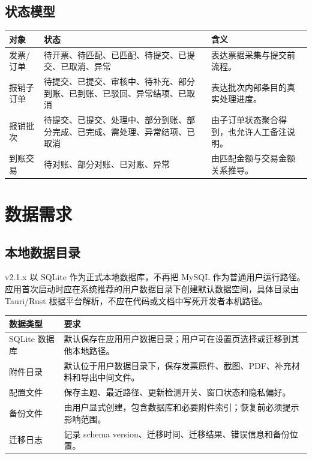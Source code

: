 \documentclass[UTF8,zihao=-4]{ctexart}
\begin{document}
\subsection{状态模型}

\begin{longtable}{p{3.2cm}p{4.4cm}p{6.8cm}}
\toprule
对象 & 状态 & 含义 \\
\midrule
发票/订单 & 待开票、待匹配、已匹配、待提交、已提交、已取消、异常 & 表达票据采集与提交前流程。 \\
报销子订单 & 待提交、已提交、审核中、待补充、部分到账、已到账、已驳回、异常结项、已取消 & 表达批次内部条目的真实处理进度。 \\
报销批次 & 待提交、已提交、处理中、部分到账、部分完成、已完成、需处理、异常结项、已取消 & 由子订单状态聚合得到，也允许人工备注说明。 \\
到账交易 & 待对账、部分对账、已对账、异常 & 由匹配金额与交易金额关系推导。 \\
\bottomrule
\end{longtable}

\section{数据需求}

\subsection{本地数据目录}

v2.1.x 以 SQLite 作为正式本地数据库，不再把 MySQL 作为普通用户运行路径。应用首次启动时应在系统推荐的用户数据目录下创建默认数据空间，具体目录由 Tauri/Rust 根据平台解析，不应在代码或文档中写死开发者本机路径。

\begin{longtable}{p{4.0cm}p{10.4cm}}
\toprule
数据类型 & 要求 \\
\midrule
SQLite 数据库 & 默认保存在应用用户数据目录；用户可在设置页选择或迁移到其他本地路径。 \\
附件目录 & 默认位于用户数据目录下，保存发票原件、截图、PDF、补充材料和导出中间文件。 \\
配置文件 & 保存主题、最近路径、更新检测开关、窗口状态和隐私偏好。 \\
备份文件 & 由用户显式创建，包含数据库和必要附件索引；恢复前必须提示影响范围。 \\
迁移日志 & 记录 schema version、迁移时间、迁移结果、错误信息和备份位置。 \\
\bottomrule
\end{longtable}
\end{document}
